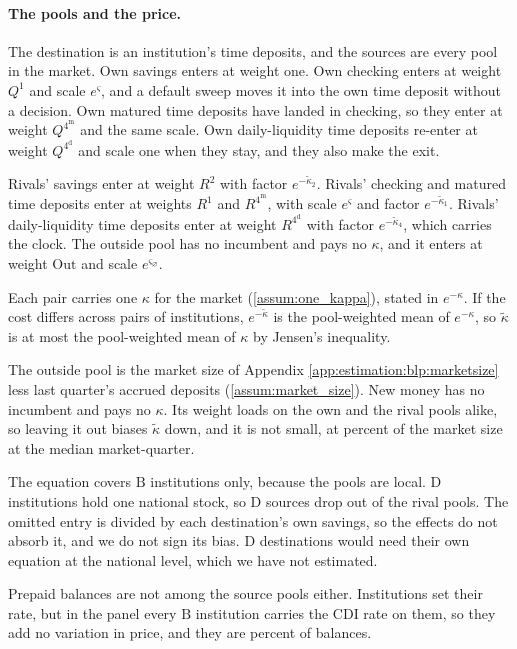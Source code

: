 \paragraph{The pools and the price.} The destination is an institution's time deposits, and the sources are every pool in the market. Own savings enters at weight one. Own checking enters at weight $Q^{1}$ and scale $e^{\varsigma}$, and a default sweep moves it into the own time deposit without a decision. Own matured time deposits have landed in checking, so they enter at weight $Q^{4^{\mathrm{m}}}$ and the same scale. Own daily-liquidity time deposits re-enter at weight $Q^{4^{\mathrm{d}}}$ and scale one when they stay, and they also make the exit.

Rivals' savings enter at weight $R^{2}$ with factor $e^{-\tilde{\kappa}_2}$. Rivals' checking and matured time deposits enter at weights $R^{1}$ and $R^{4^{\mathrm{m}}}$, with scale $e^{\varsigma}$ and factor $e^{-\tilde{\kappa}_1}$. Rivals' daily-liquidity time deposits enter at weight $R^{4^{\mathrm{d}}}$ with factor $e^{-\tilde{\kappa}_4}$, which carries the clock. The outside pool has no incumbent and pays no $\kappa$, and it enters at weight $\mathrm{Out}$ and scale $e^{\varsigma_{\varnothing}}$.

Each pair carries one $\kappa$ for the market (\ref{assum:one_kappa}), stated in $e^{-\kappa}$. If the cost differs across pairs of institutions, $e^{-\tilde{\kappa}}$ is the pool-weighted mean of $e^{-\kappa}$, so $\tilde{\kappa}$ is at most the pool-weighted mean of $\kappa$ by Jensen's inequality.

The outside pool is the market size of Appendix \ref{app:estimation:blp:marketsize} less last quarter's accrued deposits (\ref{assum:market_size}). New money has no incumbent and pays no $\kappa$. Its weight loads on the own and the rival pools alike, so leaving it out biases $\tilde{\kappa}$ down, and it is not small, at  percent of the market size at the median market-quarter.

The equation covers $\mathrm{B}$ institutions only, because the pools are local. $\mathrm{D}$ institutions hold one national stock, so $\mathrm{D}$ sources drop out of the rival pools. The omitted entry is divided by each destination's own savings, so the effects do not absorb it, and we do not sign its bias. $\mathrm{D}$ destinations would need their own equation at the national level, which we have not estimated.

Prepaid balances are not among the source pools either. Institutions set their rate, but in the panel every $\mathrm{B}$ institution carries the CDI rate on them, so they add no variation in price, and they are  percent of balances.

